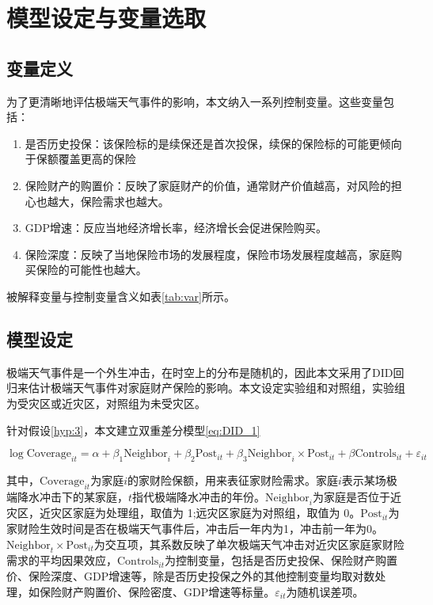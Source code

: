 \section{模型设定与变量选取}
\subsection{变量定义}
为了更清晰地评估极端天气事件的影响，本文纳入一系列控制变量。这些变量包括：

\begin{enumerate}
    \item 是否历史投保：该保险标的是续保还是首次投保，续保的保险标的可能更倾向于保额覆盖更高的保险
    \item 保险财产的购置价：反映了家庭财产的价值，通常财产价值越高，对风险的担心也越大，保险需求也越大。
    \item GDP增速：反应当地经济增长率，经济增长会促进保险购买。
    \item 保险深度：反映了当地保险市场的发展程度，保险市场发展程度越高，家庭购买保险的可能性也越大。
\end{enumerate}

被解释变量与控制变量含义如表\ref{tab:var}所示。


\subsection{模型设定}
极端天气事件是一个外生冲击，在时空上的分布是随机的，因此本文采用了DID回归来估计极端天气事件对家庭财产保险的影响。本文设定实验组和对照组，实验组为受灾区或近灾区，对照组为未受灾区。

针对假设\ref{hyp:3}，本文建立双重差分模型\ref{eq:DID_1}

\begin{equation}
    \log\text{Coverage}_{it}=\alpha+\beta_1\text{Neighbor}_{i}+\beta_2\text{Post}_{it}+\beta_3\text{Neighbor}_{i}\times\text{Post}_{it}+\beta\text{Controls}_{it}+\varepsilon_{it}
    \label{eq:DID_2}
\end{equation}

其中，$\text{Coverage}_{it}$为家庭$i$的家财险保额，用来表征家财险需求。家庭$i$表示某场极端降水冲击下的某家庭，$t$指代极端降水冲击的年份。$\text{Neighbor}_{i}$为家庭是否位于近灾区，近灾区家庭为处理组，取值为 1;远灾区家庭为对照组，取值为 0。$\text{Post}_{it}$为家财险生效时间是否在极端天气事件后，冲击后一年内为1，冲击前一年为0。$\text{Neighbor}_{t}\times\text{Post}_{it}$为交互项，其系数反映了单次极端天气冲击对近灾区家庭家财险需求的平均因果效应，$\text{Controls}_{it}$为控制变量，包括是否历史投保、保险财产购置价、保险深度、GDP增速等，除是否历史投保之外的其他控制变量均取对数处理，如保险财产购置价、保险密度、GDP增速等标量。$\varepsilon_{it}$为随机误差项。

